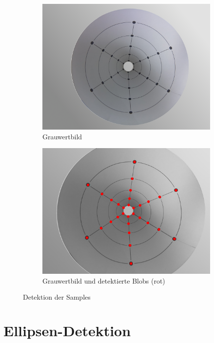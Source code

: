 \begin{figure}[!htb]
	\centering
	\begin{subfigure}{.5\textwidth}
		\centering
		\includegraphics[width=.9\textwidth]{images/coneRasp.jpg}
		\caption{Grauwertbild}
	\end{subfigure}%
	\begin{subfigure}{.5\textwidth}
		\centering
		\includegraphics[width=.9\textwidth]{images/coneRaspDetectedDots.png}
		\caption{Grauwertbild und detektierte Blobs (rot)}
	\end{subfigure}
	\caption{Detektion der Samples}
	\label{fig:blobDetect}
\end{figure}


\section{Ellipsen-Detektion}
\label{s:ellipseDetection}

